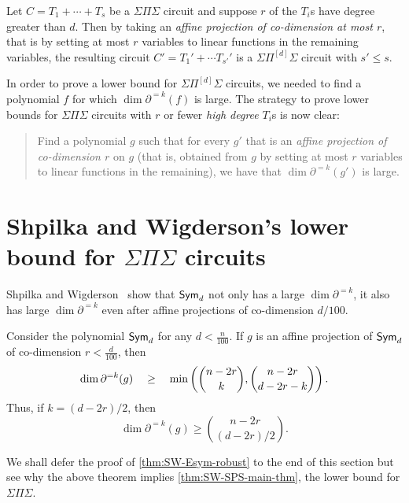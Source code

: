 \begin{lemma}\label{lem:d3-few-affine-projection}
  Let $C = T_1 + \cdots + T_s$ be a $\Sigma\Pi\Sigma$ circuit and suppose $r$ of the $T_i$s have degree greater than $d$.
Then by taking an \emph{affine projection of co-dimension at most $r$}, that is by setting at most $r$ variables to linear functions in the remaining variables, the resulting circuit $C' = T_1' + \cdots T_{s'}'$ is a $\Sigma\Pi^{[d]}\Sigma$ circuit with $s' \leq s$.
\end{lemma}

In order to prove a lower bound for $\Sigma\Pi^{[d]}\Sigma$ circuits, we needed to find a polynomial $f$ for which $\dim \partial^{=k}(f)$ is large.
The strategy to prove lower bounds for $\Sigma\Pi\Sigma$ circuits with $r$ or fewer \emph{high degree} $T_i$s is now clear:
\begin{quote}
  Find a polynomial $g$ such that for every $g'$ that is an \emph{affine projection of co-dimension $r$} on $g$ (that is, obtained from $g$ by setting at most $r$ variables to linear functions in the remaining), we have that $\dim \partial^{=k}(g')$ is large.  
\end{quote}

\section{Shpilka and Wigderson's lower bound for $\Sigma\Pi\Sigma$ circuits}

Shpilka and Wigderson~\cite{sw2001} show that $\operatorname{\mathsf{Sym}}_d$ not only has a large $\dim \partial^{=k}$, it also has large $\dim \partial^{=k}$ even after affine projections of co-dimension $d/100$. 

\begin{theorem}[\cite{sw2001}]\label{thm:SW-Esym-robust} Consider the polynomial $\operatorname{\mathsf{Sym}}_d$ for any $d < \frac{n}{100}$. If $g$ is an affine projection of $\operatorname{\mathsf{Sym}}_d$ of co-dimension $r < \frac{d}{100}$, then
\[
\dim \partial^{=k}(g) \quad \geq \quad \min\left(\binom{n-2r}{k},\binom{n-2r}{d-2r -k}\right).
\]
Thus, if $k = (d-2r)/2$, then 
\[
\dim \partial^{=k}(g) \geq \binom{n-2r}{(d-2r)/2}.
\]
\end{theorem}

We shall defer the proof of \autoref{thm:SW-Esym-robust} to the end of this section but see why the above theorem
implies \autoref{thm:SW-SPS-main-thm}, the lower bound for $\Sigma\Pi\Sigma$.

